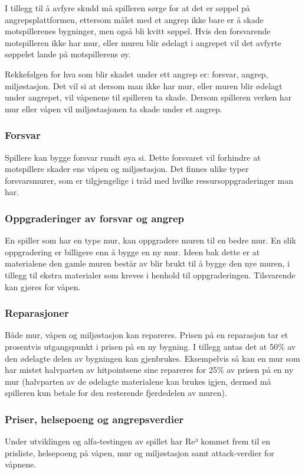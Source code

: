 I tillegg til å avfyre skudd må spilleren sørge for at det er søppel på angrepsplattformen, ettersom målet med et angrep ikke bare er å skade motspillerenes bygninger, men også bli kvitt søppel. Hvis den forsvarende motspilleren ikke har mur, eller muren blir ødelagt i angrepet vil det avfyrte søppelet lande på motspillerens øy.

Rekkefølgen for hva som blir skadet under ett angrep er: forsvar, angrep, miljøstasjon. Det vil si at dersom man ikke har mur, eller muren blir ødelagt under angrepet, vil våpenene til spilleren ta skade. Dersom spilleren verken har mur eller våpen vil miljøstasjonen ta skade under et angrep. 


\subsubsection{Forsvar}
Spillere kan bygge forsvar rundt øya si. Dette forsvaret vil forhindre at motspillere skader ens våpen og miljøstasjon. Det finnes ulike typer forsvarsmurer, som er tilgjengelige i tråd med hvilke ressursoppgraderinger man har. 


\subsubsection{Oppgraderinger av forsvar og angrep}
En spiller som har en type mur, kan oppgradere muren til en bedre mur. En slik oppgradering er billigere enn å bygge en ny mur. Ideen bak dette er at materialene den gamle muren består av blir brukt til å bygge den nye muren, i tillegg til ekstra materialer som kreves i henhold til oppgraderingen. Tilsvarende kan gjøres for våpen.


\subsubsection{Reparasjoner}
Både mur, våpen og miljøstasjon kan repareres. Prisen på en reparasjon tar et prosentvis utgangspunkt i prisen på en ny bygning. I tillegg antas det at 50\% av den ødelagte delen av bygningen kan gjenbrukes. Eksempelvis så kan en mur som har mistet halvparten av hitpointsene sine repareres for 25\% av prisen på en ny mur (halvparten av de ødelagte materialene kan brukes igjen, dermed må spilleren kun betale for den resterende fjerdedelen av muren).


\subsubsection{Priser, helsepoeng og angrepsverdier}
Under utviklingen og alfa-testingen av spillet har Re³ kommet frem til en prisliste, helsepoeng på våpen, mur og miljøstasjon samt attack-verdier for våpnene.

